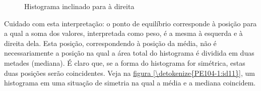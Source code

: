 \begin{figure}[H]
\centering
\capstart

\caption{Histograma inclinado para à direita}\label{\detokenize{PE104-1:id3}}\label{\detokenize{PE104-1:id10}}
\end{figure}

Cuidado com esta interpretação: o ponto de equilíbrio corresponde à posição para a qual a soma dos valores, interpretada como peso, é a mesma à esquerda e à direita dela. Esta posição, correspondendo à posição da média, não é necessariamente a posição na qual a área total do histograma é dividida em duas metades (mediana). É claro que, se a forma do histograma for simétrica, estas duas posições serão coincidentes. Veja na \hyperref[\detokenize{PE104-1:id11}]{figura \ref{\detokenize{PE104-1:id11}}}, um histograma em uma situação de simetria na qual a média e a mediana coincidem.



